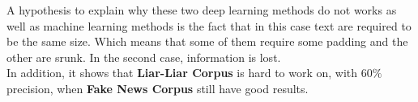 A hypothesis to explain why these two deep learning methods do not works as well as machine learning methods is the fact that in this case text are required to be the same size. Which means that some of them require some padding and the other are srunk. In the second case, information is lost. \\

In addition, it shows that \textbf{Liar-Liar Corpus} is hard to work on, with $60\%$ precision, when \textbf{Fake News Corpus} still have good results. 